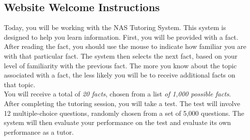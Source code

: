\documentclass{sig-alternate-05-2015}
\begin{document}
\subsection{Website Welcome Instructions}
\noindent Today, you will be working with the NAS Tutoring System. This system is designed to help you learn information. First, you will be provided with a fact. After reading the fact, you should use the mouse to indicate how familiar you are with that particular fact. The system then selects the next fact, based on your level of familiarity with the previous fact. The more you know about the topic associated with a fact, the less likely you will be to receive additional facts on that topic.\\
				
\noindent You will receive a total of \emph{20 facts}, chosen from a list \emph{of 1,000 possible facts}. After completing the tutoring session, you will take a test. The test will involve 12 multiple-choice questions, randomly chosen from a set of 5,000 questions. The system will then evaluate your performance on the test and evaluate its own performance as a tutor.
\end{document}

